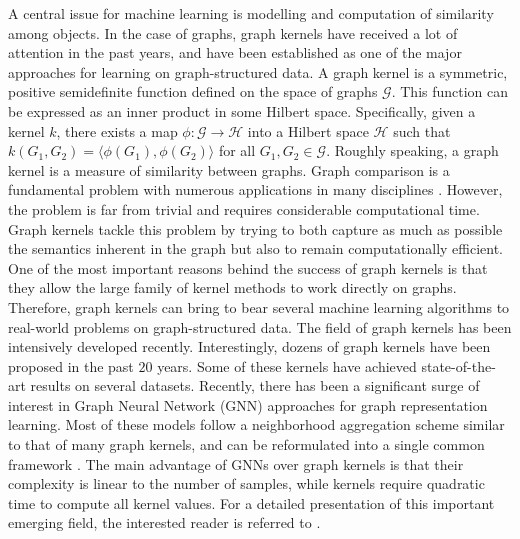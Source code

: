 \documentclass[twoside,11pt]{article}
\begin{document}
A central issue for machine learning is modelling and computation of similarity among objects.
In the case of graphs, graph kernels have received a lot of attention in the past years, and have been established as one of the major approaches for learning on graph-structured data.
A graph kernel is a symmetric, positive semidefinite function defined on the space of graphs $\mathcal{G}$.
This function can be expressed as an inner product in some Hilbert space.
Specifically, given a kernel $k$, there exists a map $\phi : \mathcal{G} \rightarrow \mathcal{H}$ into a Hilbert space $\mathcal{H}$ such that $k(G_1,G_2) = \langle \phi(G_1), \phi(G_2) \rangle$ for all $G_1,G_2 \in \mathcal{G}$.
Roughly speaking, a graph kernel is a measure of similarity between graphs.
Graph comparison is a fundamental problem with numerous applications in many disciplines .
However, the problem is far from trivial and requires considerable computational time.
Graph kernels tackle this problem by trying to both capture as much as possible the semantics inherent in the graph but also to remain computationally efficient.
One of the most important reasons behind the success of graph kernels is that they allow the large family of kernel methods to work directly on graphs.
Therefore, graph kernels can bring to bear several machine learning algorithms to real-world problems on graph-structured data.
The field of graph kernels has been intensively developed recently.
Interestingly, dozens of graph kernels have been proposed in the past $20$ years.
Some of these kernels have achieved state-of-the-art results on several datasets.
Recently, there has been a significant surge of interest in Graph Neural Network (GNN) approaches for graph representation learning.
Most of these models follow a neighborhood aggregation scheme similar to that of many graph kernels, and can be reformulated into a single common framework .
The main advantage of GNNs over graph kernels is that their complexity is linear to the number of samples, while kernels require quadratic time to compute all kernel values.
For a detailed presentation of this important emerging field, the interested reader is referred to .
\end{document}
